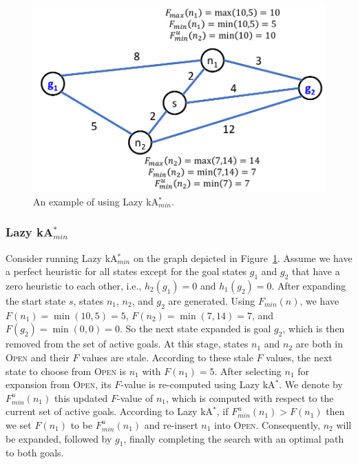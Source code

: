 \documentclass{aicom2e}
\newcommand{\kastar}{kA$^*$}
\newcommand{\kastarmin}{kA$^*_{min}$}
\newcommand{\minf}{$F_{min}(n)$}
\newcommand{\open}{\textsc{Open}}
\begin{document}
\begin{figure}
	\includegraphics[width=\columnwidth]{Lazy_cropped_cropped.pdf}
	\caption{An example of using Lazy \kastarmin{}.}
	\label{fig:lazy}
\end{figure}



\subsubsection{Lazy \kastarmin{}}

Consider running Lazy \kastarmin{} on the graph depicted in Figure~\ref{fig:lazy}. Assume we have a perfect heuristic for 
all states except for the goal states $g_1$ and $g_2$ that have a zero
heuristic to each other, i.e., $h_2(g_1)=0$ and $h_1(g_2)=0$. After expanding
the start state $s$, states $n_1$, $n_2$, and $g_2$ are generated. Using
\minf{}, we have $F(n_1)=\min(10,5)=5$, $F(n_2)=\min(7,14)=7$, and
$F(g_2)=\min(0,0)=0$. So the next state expanded is goal $g_2$, which is then
removed from the set of active goals. At this stage, states $n_1$ and $n_2$ are
both in \open{} and their $F$ values are stale.
According to these stale $F$ values, the next state to
choose from \open{} is $n_1$ with $F(n_1)=5$. After selecting $n_1$ for expansion from 
\open{}, its $F$-value is re-computed using Lazy \kastar{}. We denote
by $F^u_{min}(n_1)$ this updated $F$-value of $n_1$, which is computed with respect
to the current set of active goals. According to Lazy \kastar{}, if
$F^u_{min}(n_1)> F(n_1)$ then we set $F(n_1)$ to be $F^u_{min}(n_1)$ and re-insert
$n_1$ into \open{}. Consequently, $n_2$ will be expanded, followed by $g_1$,
finally completing the search with an optimal path to both goals. %
\end{document}
